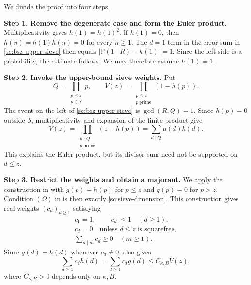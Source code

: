 \documentclass[twoside]{aomart}
\makeatletter
\theoremstyle{paperplain}
\theoremstyle{paperdefinition}
\renewenvironment{proof}[1][\proofname]{\par\pushQED{\qed}%
  \normalfont\topsep6\p@\@plus3\p@\relax\trivlist
  \item[\hskip\labelsep\itshape #1\@addpunct{.}]\ignorespaces
}{\popQED\endtrivlist\@endpefalse}
\numberwithin{equation}{section}
\makeatother
\begin{document}
\begin{proof}[Proof of \eqref{sc:bsz-upper-sieve}]
We divide the proof into four steps.

\medskip
\noindent\textbf{Step 1. Remove the degenerate case and form the Euler product.}
Multiplicativity gives $h(1)=h(1)^2$.
If $h(1)=0$, then $h(n)=h(1)h(n)=0$ for every $n\ge1$.
The $d=1$ term in the error sum in \eqref{sc:bsz-upper-sieve}
then equals $|\mathbb P(1\mid R)-h(1)|=1$.
Since the left side is a probability, the estimate follows.
We may therefore assume $h(1)=1$.

\medskip
\noindent\textbf{Step 2. Invoke the upper-bound sieve weights.}
Put
\begin{equation*}
 Q=\prod_{\substack{p\le z\\p\in\mathcal S}}p,
 \qquad V(z)=\prod_{\substack{p\le z\\p\ \mathrm{prime}}}(1-h(p)).
\end{equation*}
The event on the left of \eqref{sc:bsz-upper-sieve} is
$\gcd(R,Q)=1$. Since $h(p)=0$ outside $\mathcal S$,
multiplicativity and expansion of the finite product give
\begin{equation*}
 V(z)=\prod_{\substack{p\mid Q\\p\ \mathrm{prime}}}(1-h(p))
     =\sum_{d\mid Q}\mu(d)h(d).
\end{equation*}
This explains the Euler product, but its divisor sum need not be
supported on $d\le z$.

\medskip
\noindent\textbf{Step 3. Restrict the weights and obtain a majorant.}
We apply the construction in
\cite[Lemma~2.2, p.~16, and proof of Theorem~2.4, pp.~18--19]{FordSieve2023}
with $g(p)=h(p)$ for $p\le z$ and $g(p)=0$ for $p>z$.
Condition $(\Omega)$ in \cite[p.~18]{FordSieve2023}
is then exactly \eqref{sc:sieve-dimension}.
This construction gives real weights $(c_d)_{d\ge1}$ satisfying
\begin{equation*}
 \begin{gathered}
 c_1=1,\qquad |c_d|\le1\quad(d\ge1),\\
 c_d=0\quad\text{unless }d\le z\text{ is squarefree},\\
 \sum_{d\mid m}c_d\ge0\quad(m\ge1).
 \end{gathered}
 \end{equation*}
Since $g(d)=h(d)$ whenever $c_d\ne0$,
\cite[(2.8), p.~17, and (2.11), p.~19]{FordSieve2023} also gives
\begin{equation}
 \sum_{d\ge1}c_dh(d)=\sum_{d\ge1}c_dg(d)
 \le C_{\kappa,B}V(z),
 \label{sc:upper-sieve-original-main-term}
\end{equation}
where $C_{\kappa,B}>0$ depends only on $\kappa,B$.


\end{proof}
\end{document}
